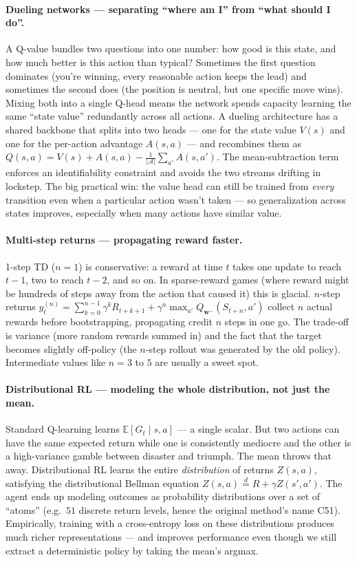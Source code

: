 \documentclass[11pt, oneside]{book}
\newcommand{\E}{\mathbb{E}}              %
\begin{document}
\paragraph{Dueling networks --- separating ``where am I'' from ``what should I do''.}
A Q-value bundles two questions into one number: how good is this state, and how
much better is this action than typical?
Sometimes the first question dominates (you're winning, every reasonable action
keeps the lead) and sometimes the second does (the position is neutral, but one
specific move wins). Mixing both into a single Q-head means the network spends
capacity learning the same ``state value'' redundantly across all actions.
A dueling architecture has a shared backbone that splits into two heads --- one for
the state value $V(s)$ and one for the per-action advantage $A(s,a)$ --- and
recombines them as $Q(s,a) = V(s) + A(s,a) - \tfrac{1}{|\mathcal{A}|}\sum_{a'} A(s,a')$.
The mean-subtraction term enforces an identifiability constraint and avoids the
two streams drifting in lockstep.
The big practical win: the value head can still be trained from \emph{every}
transition even when a particular action wasn't taken --- so generalization across
states improves, especially when many actions have similar value.

\paragraph{Multi-step returns --- propagating reward faster.}
1-step TD ($n = 1$) is conservative: a reward at time $t$ takes one update to reach
$t-1$, two to reach $t-2$, and so on. In sparse-reward games (where reward might be
hundreds of steps away from the action that caused it) this is glacial.
$n$-step returns $y_t^{(n)} = \sum_{k=0}^{n-1} \gamma^k R_{t+k+1} + \gamma^n \max_{a'} Q_{\mathbf{w}^-}(S_{t+n}, a')$
collect $n$ actual rewards before bootstrapping, propagating credit $n$ steps in one
go. The trade-off is variance (more random rewards summed in) and the fact that the
target becomes slightly off-policy (the $n$-step rollout was generated by the old
policy). Intermediate values like $n = 3$ to $5$ are usually a sweet spot.

\paragraph{Distributional RL --- modeling the whole distribution, not just the mean.}
Standard Q-learning learns $\E[G_t \mid s, a]$ --- a single scalar.
But two actions can have the same expected return while one is consistently mediocre
and the other is a high-variance gamble between disaster and triumph. The mean throws
that away.
Distributional RL learns the entire \emph{distribution} of returns $Z(s, a)$, satisfying
the distributional Bellman equation $Z(s,a) \overset{d}{=} R + \gamma Z(s', a')$.
The agent ends up modeling outcomes as probability distributions over a set of
``atoms'' (e.g.\ $51$ discrete return levels, hence the original method's name C51).
Empirically, training with a cross-entropy loss on these distributions produces much
richer representations --- and improves performance even though we still extract a
deterministic policy by taking the mean's argmax.
\end{document}
